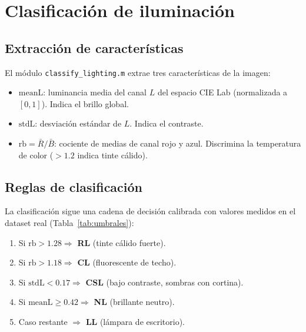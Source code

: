 \documentclass[11pt,a4paper]{article}
\begin{document}
\section{Clasificación de iluminación}
\label{sec:classify}

\subsection{Extracción de características}

El módulo \texttt{classify\_lighting.m} extrae tres características de la imagen:

\begin{itemize}
    \item $\text{meanL}$: luminancia media del canal $L$ del espacio CIE Lab
          (normalizada a $[0,1]$). Indica el brillo global.
    \item $\text{stdL}$: desviación estándar de $L$. Indica el contraste.
    \item $\text{rb} = \bar{R}/\bar{B}$: cociente de medias de canal rojo y azul.
          Discrimina la temperatura de color ($>1.2$ indica tinte cálido).
\end{itemize}

\subsection{Reglas de clasificación}

La clasificación sigue una cadena de decisión calibrada con valores medidos en el
dataset real (Tabla~\ref{tab:umbrales}):

\begin{enumerate}
    \item Si $\text{rb} > 1.28 \Rightarrow$ \textbf{RL} (tinte cálido fuerte).
    \item Si $\text{rb} > 1.18 \Rightarrow$ \textbf{CL} (fluorescente de techo).
    \item Si $\text{stdL} < 0.17 \Rightarrow$ \textbf{CSL} (bajo contraste, sombras con cortina).
    \item Si $\text{meanL} \geq 0.42 \Rightarrow$ \textbf{NL} (brillante neutro).
    \item Caso restante $\Rightarrow$ \textbf{LL} (lámpara de escritorio).
\end{enumerate}
\end{document}
